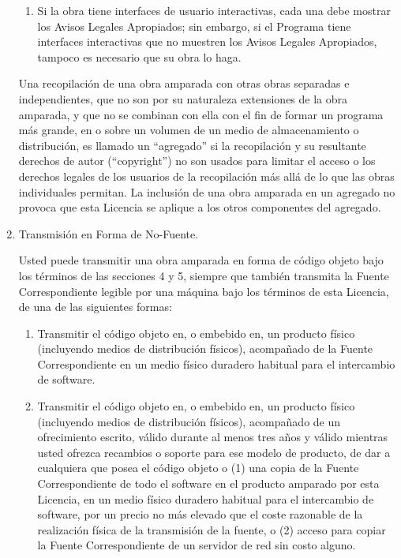 \documentclass[11pt]{article}
\begin{document}
\begin{enumerate}
\begin{enumerate}
  \item Si la obra tiene interfaces de usuario interactivas, cada una 
  debe mostrar los Avisos Legales Apropiados; sin embargo, si el Programa 
  tiene interfaces interactivas que no muestren los Avisos Legales 
  Apropiados, tampoco es necesario que su obra lo haga.
\end{enumerate}
Una recopilaci\'{o}n de una obra amparada con otras obras separadas e 
independientes, que no son por su naturaleza extensiones de la obra 
amparada, y que no se combinan con ella con el fin de formar un programa 
m\'{a}s grande, en o sobre un volumen de un medio de almacenamiento o 
distribuci\'{o}n, es llamado un ``agregado'' si la recopilaci\'{o}n y su 
resultante derechos de autor (``copyright'') no son usados para limitar el acceso o los 
derechos legales de los usuarios de la recopilaci\'{o}n m\'{a}s all\'{a} de lo que 
las obras individuales permitan.  La inclusi\'{o}n de una obra amparada en 
un agregado no provoca que esta Licencia se aplique a los otros 
componentes del agregado.

\item Transmisi\'{o}n en Forma de No-Fuente.

Usted puede transmitir una obra amparada en forma de c\'{o}digo objeto 
bajo los t\'{e}rminos de las secciones 4 y 5, siempre que tambi\'{e}n transmita
la Fuente Correspondiente legible por una m\'{a}quina bajo los t\'{e}rminos de 
esta Licencia, de una de las siguientes formas:
  \begin{enumerate}
  \item Transmitir el c\'{o}digo objeto en, o embebido en, un producto f\'{i}sico 
    (incluyendo medios de distribuci\'{o}n f\'{i}sicos), acompa\~nado de la Fuente 
    Correspondiente en un medio f\'{i}sico duradero habitual para el 
    intercambio de software.

  \item Transmitir el c\'{o}digo objeto en, o embebido en, un producto f\'{i}sico 
    (incluyendo medios de distribuci\'{o}n f\'{i}sicos), acompa\~nado de un 
    ofrecimiento escrito, v\'{a}lido durante al menos tres a\~nos y v\'{a}lido 
    mientras usted ofrezca recambios o soporte para ese modelo de 
    producto, de dar a cualquiera que posea el c\'{o}digo objeto o (1) una
    copia de la Fuente Correspondiente de todo el software en el 
    producto amparado por esta Licencia, en un medio f\'{i}sico duradero 
    habitual para el intercambio de software, por un precio no m\'{a}s 
    elevado que el coste razonable de la realizaci\'{o}n f\'{i}sica de la 
    transmisi\'{o}n de la fuente, o (2) acceso para copiar la Fuente 
    Correspondiente de un servidor de red sin costo alguno.


\end{enumerate}
\end{enumerate}
\end{document}

